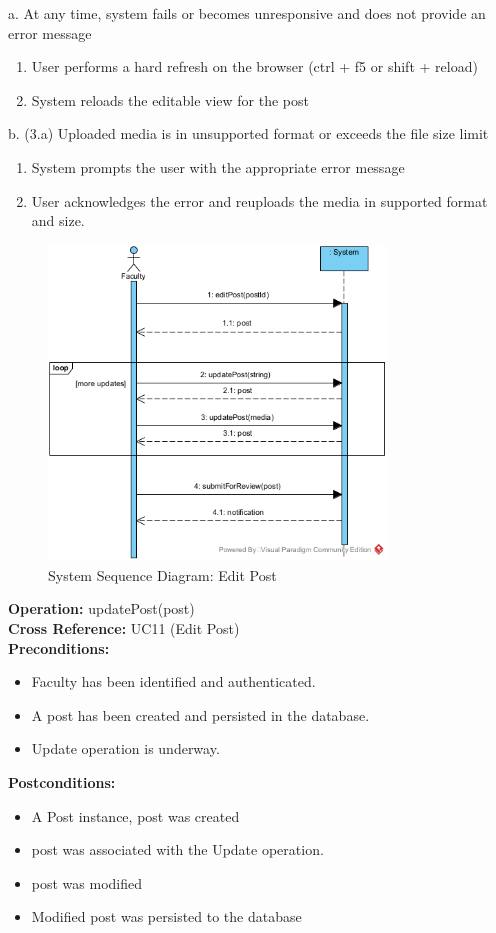 a. At any time, system fails or becomes unresponsive and does not provide an error message
\begin{enumerate}
    \item User performs a hard refresh on the browser (ctrl + f5 or shift + reload)
    \item System reloads the editable view for the post
\end{enumerate}
b. (3.a) Uploaded media is in unsupported format or exceeds the file size limit
\begin{enumerate}
    \item System prompts the user with the appropriate error message
    \item User acknowledges the error and reuploads the media in supported format and size.
\end{enumerate}

\begin{figure}[H]
    \centering
    \includegraphics[width=0.8\textwidth]{images/SSD-UC11-EditPost.png}
    \centering
    \caption{System Sequence Diagram: Edit Post}
\end{figure}

\textbf{Operation:} updatePost(post) \\
\textbf{Cross Reference:} UC11 (Edit Post) \\
\textbf{Preconditions: }
\begin{itemize}
    \item Faculty has been identified and authenticated.
    \item A post has been created and persisted in the database.
    \item Update operation is underway.
\end{itemize}
\textbf{Postconditions:}
\begin{itemize}
    \item A Post instance, post was created
    \item post was associated with the Update operation.
    \item post was modified
    \item Modified post was persisted to the database
\end{itemize}